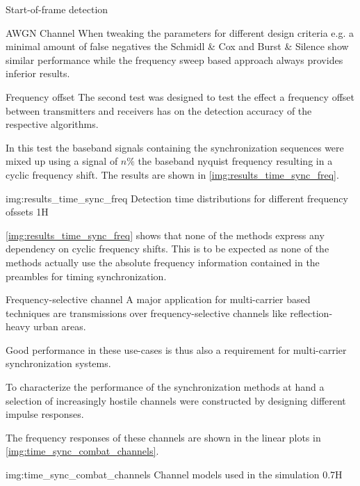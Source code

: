 \begin{subchapter}{Start-of-frame detection}
\begin{subsubchapter}{AWGN Channel}
    When tweaking the parameters for different design criteria
    e.g. a minimal amount of false negatives the Schmidl \& Cox
    and Burst \& Silence show similar performance while
    the frequency sweep based approach always provides inferior
    results.
  \end{subsubchapter}

  \begin{subsubchapter}{Frequency offset}
    The second test was designed to test the effect a frequency offset
    between transmitters and receivers has on the detection accuracy
    of the respective algorithms.

    In this test the baseband signals containing the synchronization
    sequences were mixed up using a signal of $n\si{\percent}$ the
    baseband nyquist frequency resulting in a cyclic frequency shift.
    The results are shown in \autoref{img:results_time_sync_freq}.

                 {img:results_time_sync_freq}
                 {Detection time distributions for different frequency ofssets}
                 {1}{H}

    \autoref{img:results_time_sync_freq} shows that none of the
    methods express any dependency on cyclic frequency shifts.
    This is to be expected as none of the methods actually use
    the absolute frequency information contained in the preambles
    for timing synchronization.
  \end{subsubchapter}

  \begin{subsubchapter}{Frequency-selective channel}
    A major application for multi-carrier based techniques
    are transmissions over frequency-selective channels
    like reflection-heavy urban areas.

    Good performance in these use-cases is thus also a
    requirement for multi-carrier synchronization systems.

    To characterize the performance of the synchronization
    methods at hand a selection of increasingly hostile
    channels were constructed by designing different
    impulse responses.

    The frequency responses of these channels are shown
    in the linear plots in \autoref{img:time_sync_combat_channels}.

                 {img:time_sync_combat_channels}
                 {Channel models used in the simulation}
                 {0.7}{H}


\end{subsubchapter}
\end{subchapter}
